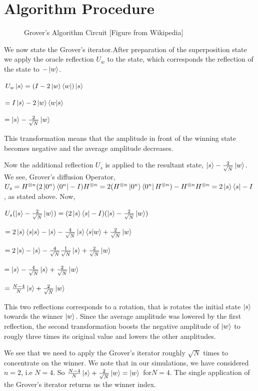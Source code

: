\documentclass{article}
\begin{document}
\section{Algorithm Procedure}
\begin{figure}[H]
\centering 
\noindent{}%
\caption{Grover's Algorithm Circuit [Figure from Wikipedia]}
\end{figure}
We now state the Grover's iterator.After preparation of the superposition state we apply the oracle reflection $U_w$ to the state, which corresponds the reflection of the state to $-\ket{w}$.
\begin{center}
$U_w \ket{s} = (I-2\ket{w} \bra{w})\ket{s}$\par
$=I\ket{s}-2\ket{w}\braket{w|s}$\par
$=\ket{s}-{2\over{\sqrt{N}}}\ket{w}$
\end{center}
This transformation means that the amplitude in front of the winning state becomes negative and the average amplitude decreases.\par
Now the additional reflection $U_s$ is applied to the resultant state, $\ket{s}-{2\over{\sqrt{N}}}\ket{w}$. We see, Grover's diffusion Operator, $U_s=H^{\otimes n}(2\ket{0^n}\bra{0^n}-I)H^{\otimes n}=2(H^{\otimes n}\ket{0^n}\bra{0^n}H^{\otimes n})-H^{\otimes n}H^{\otimes n}=2\ket{s}\bra{s}-I$, as stated above. Now,
\begin{center}
$U_s(\ket{s}-{2\over{\sqrt{N}}}\ket{w})=(2\ket{s}\bra{s} - I)(\ket{s}-{2\over{\sqrt{N}}}\ket{w})$\par
$=2\ket{s}\braket{s|s}-\ket{s}-{4\over \sqrt{N}}\ket{s}\braket{s|w}+{2\over \sqrt{N}}\ket{w}$\par
$=2\ket{s}-\ket{s}-{4\over \sqrt{N}}{1\over \sqrt{N}}\ket{s}+{2\over \sqrt{N}}\ket{w}$\par
$=\ket{s}-{4\over \sqrt{N}}\ket{s}+{2\over \sqrt{N}}\ket{w}$\par
$={{N-4}\over N}\ket{s}+{2\over \sqrt{N}}\ket{w}$
\end{center}
This two reflections corresponds to a rotation, that is rotates the initial state $\ket{s}$ towards the winner $\ket{w}$. Since the average amplitude was lowered by the first reflection, the second transformation boosts the negative amplitude of $\ket{w}$ to rougly three times its original value and lowers the other amplitudes.\par
We see that we need to apply the Grover's iterator roughly $\sqrt{N}$ times to concentrate on the winner. We note that in our simulations, we have considered $n=2$, i.e $N=4$. So ${{N-4}\over N}\ket{s}+{2\over \sqrt{N}}\ket{w}=\ket{w}$ for$N=4$. The single application of the Grover's iterator returns us the winner index.
\end{document}
